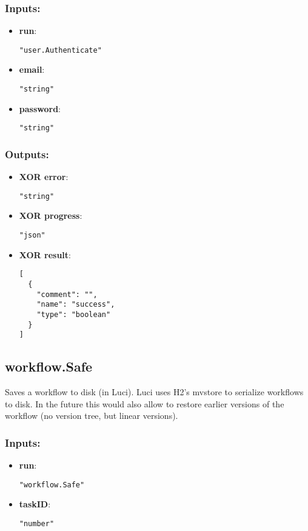 \subsubsection*{Inputs:}
\begin{itemize}
    \item \textbf{run}: 
\begin{lstlisting}
"user.Authenticate"
\end{lstlisting}
    \item \textbf{email}: 
\begin{lstlisting}
"string"
\end{lstlisting}
    \item \textbf{password}: 
\begin{lstlisting}
"string"
\end{lstlisting}
  \end{itemize}

\subsubsection*{Outputs:}
\begin{itemize}
    \item \textbf{XOR error}: 
\begin{lstlisting}
"string"
\end{lstlisting}
    \item \textbf{XOR progress}: 
\begin{lstlisting}
"json"
\end{lstlisting}
    \item \textbf{XOR result}: 
\begin{lstlisting}
[
  {
    "comment": "", 
    "name": "success", 
    "type": "boolean"
  }
]
\end{lstlisting}
  \end{itemize}

\subsection{workflow.Safe}
Saves
 a workflow to disk (in Luci). Luci uses H2's mvstore to serialize 
workflows to disk. In the future this would also allow to restore 
earlier versions of the workflow (no version tree, but linear versions).
\subsubsection*{Inputs:}
\begin{itemize}
    \item \textbf{run}: 
\begin{lstlisting}
"workflow.Safe"
\end{lstlisting}
    \item \textbf{taskID}: 
\begin{lstlisting}
"number"
\end{lstlisting}
  \end{itemize}

